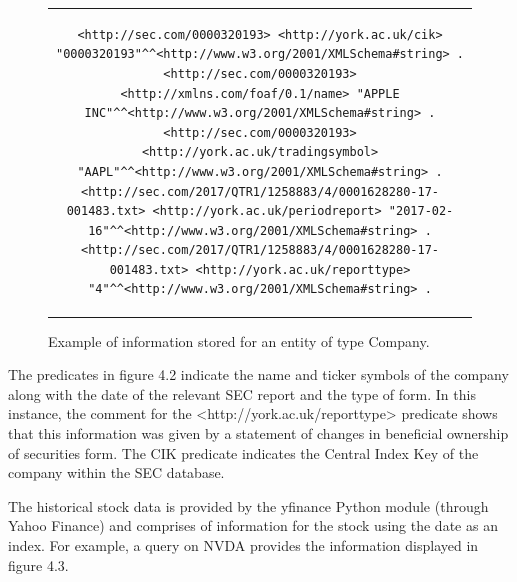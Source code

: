 \documentclass{UoYCSproject}
\begin{document}
\begin{figure}[h]
\begin{center}
\begin{tabular}{c}
\begin{lstlisting}[breaklines, basicstyle=\small, columns=fullflexible]
<http://sec.com/0000320193> <http://york.ac.uk/cik> "0000320193"^^<http://www.w3.org/2001/XMLSchema#string> .
<http://sec.com/0000320193> <http://xmlns.com/foaf/0.1/name> "APPLE INC"^^<http://www.w3.org/2001/XMLSchema#string> .
<http://sec.com/0000320193> <http://york.ac.uk/tradingsymbol> "AAPL"^^<http://www.w3.org/2001/XMLSchema#string> .
<http://sec.com/2017/QTR1/1258883/4/0001628280-17-001483.txt> <http://york.ac.uk/periodreport> "2017-02-16"^^<http://www.w3.org/2001/XMLSchema#string> .
<http://sec.com/2017/QTR1/1258883/4/0001628280-17-001483.txt> <http://york.ac.uk/reporttype> "4"^^<http://www.w3.org/2001/XMLSchema#string> .
\end{lstlisting}
\end{tabular}
\end{center}
\caption{Example of information stored for an entity of type Company.}
\end{figure}

The predicates in figure 4.2 indicate the name and ticker symbols of the company along with the date of the relevant SEC report and the type of form. In this instance, the comment for the <http://york.ac.uk/reporttype> predicate shows that this information was given by a statement of changes in beneficial ownership of securities form. The CIK predicate indicates the Central Index Key of the company within the SEC database.\newpage

The historical stock data is provided by the yfinance Python module (through Yahoo Finance) \parencite{yfinance} and comprises of information for the stock using the date as an index. For example, a query on NVDA provides the information displayed in figure 4.3.
\end{document}
